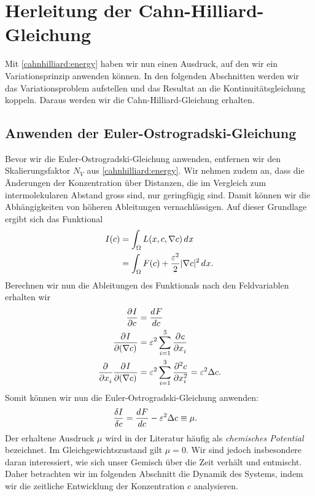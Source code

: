 %
%
%
%
\section{Herleitung der Cahn-Hilliard-Gleichung\label{cahnhilliard:section:herleitung}}
Mit \eqref{cahnhilliard:energy} haben wir nun einen Ausdruck, auf den wir ein Variationsprinzip anwenden können.
In den folgenden Abschnitten werden wir das Variationsproblem aufstellen und
das Resultat an die Kontinuitätsgleichung koppeln.
Daraus werden wir die Cahn-Hilliard-Gleichung erhalten.

\subsection{Anwenden der Euler-Ostrogradski-Gleichung}
Bevor wir die Euler-Ostrogradski-Gleichung anwenden,
entfernen wir den Skalierungsfaktor $N_V$ aus \eqref{cahnhilliard:energy}.
Wir nehmen zudem an,
dass die Änderungen der Konzentration über Distanzen,
die im Vergleich zum intermolekularen Abstand gross sind,
nur geringfügig sind.
Damit können wir die Abhängigkeiten von höheren Ableitungen vernachlässigen.
Auf dieser Grundlage ergibt sich das Funktional
\begin{align}
I(c)
&=
\int_\Omega L(x, c, \nabla c) \di{x}
\nonumber
\\
&=
\int_\Omega F(c) + \frac{\varepsilon^2}{2} |\nabla c|^2 \di{x}.
\end{align}
Berechnen wir nun die Ableitungen des Funktionals nach den Feldvariablen erhalten wir
\begin{align*}
\pderiv{I}{c}
&=
\deriv{F}{c}
\\
\pderiv{I}{(\nabla c)}
&=
\varepsilon^2 \sum_{i=1}^3 \pderiv{c}{x_i}
\\
\pderiv{}{x_i}\pderiv{I}{(\nabla c)}
&=
\varepsilon^2 \sum_{i=1}^3 \pderiv[2]{c}{x_i}
=
\varepsilon^2 \Delta c
.
\end{align*}
Somit können wir nun die Euler-Ostrogradski-Gleichung anwenden:
\begin{align*}
\frac{\delta I}{\delta c}
&=
\deriv{F}{c} -  \varepsilon^2 \Delta c
\equiv
\mu
.
\end{align*}
Der erhaltene Ausdruck $\mu$ wird in der Literatur häufig als
\emph{chemisches Potential} bezeichnet.
%
%
Im Gleichgewichtszustand gilt $\mu = 0$.
Wir sind jedoch insbesondere daran interessiert,
wie sich unser Gemisch über die Zeit verhält und entmischt.
Daher betrachten wir im folgenden Abschnitt die Dynamik des Systems,
indem wir die zeitliche Entwicklung der Konzentration
$c$ analysieren.


